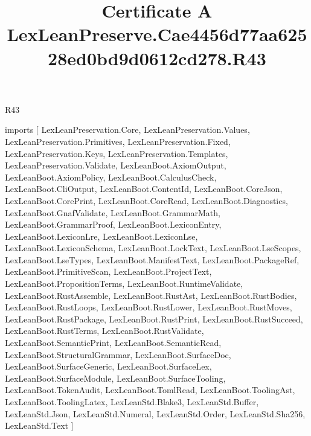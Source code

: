 \begin{lexlean}{R43}
\title{Certificate A LexLeanPreserve.Cae4456d77aa62528ed0bd9d0612cd278.R43}
\begin{coremodule}
imports [
  LexLeanPreservation.Core,
  LexLeanPreservation.Values,
  LexLeanPreservation.Primitives,
  LexLeanPreservation.Fixed,
  LexLeanPreservation.Keys,
  LexLeanPreservation.Templates,
  LexLeanPreservation.Validate,
  LexLeanBoot.AxiomOutput,
  LexLeanBoot.AxiomPolicy,
  LexLeanBoot.CalculusCheck,
  LexLeanBoot.CliOutput,
  LexLeanBoot.ContentId,
  LexLeanBoot.CoreJson,
  LexLeanBoot.CorePrint,
  LexLeanBoot.CoreRead,
  LexLeanBoot.Diagnostics,
  LexLeanBoot.GnafValidate,
  LexLeanBoot.GrammarMath,
  LexLeanBoot.GrammarProof,
  LexLeanBoot.LexiconEntry,
  LexLeanBoot.LexiconLre,
  LexLeanBoot.LexiconLse,
  LexLeanBoot.LexiconSchema,
  LexLeanBoot.LockText,
  LexLeanBoot.LseScopes,
  LexLeanBoot.LseTypes,
  LexLeanBoot.ManifestText,
  LexLeanBoot.PackageRef,
  LexLeanBoot.PrimitiveScan,
  LexLeanBoot.ProjectText,
  LexLeanBoot.PropositionTerms,
  LexLeanBoot.RuntimeValidate,
  LexLeanBoot.RustAssemble,
  LexLeanBoot.RustAst,
  LexLeanBoot.RustBodies,
  LexLeanBoot.RustLoops,
  LexLeanBoot.RustLower,
  LexLeanBoot.RustMoves,
  LexLeanBoot.RustPackage,
  LexLeanBoot.RustPrint,
  LexLeanBoot.RustSucceed,
  LexLeanBoot.RustTerms,
  LexLeanBoot.RustValidate,
  LexLeanBoot.SemanticPrint,
  LexLeanBoot.SemanticRead,
  LexLeanBoot.StructuralGrammar,
  LexLeanBoot.SurfaceDoc,
  LexLeanBoot.SurfaceGeneric,
  LexLeanBoot.SurfaceLex,
  LexLeanBoot.SurfaceModule,
  LexLeanBoot.SurfaceTooling,
  LexLeanBoot.TokenAudit,
  LexLeanBoot.TomlRead,
  LexLeanBoot.ToolingAst,
  LexLeanBoot.ToolingLatex,
  LexLeanStd.Blake3,
  LexLeanStd.Buffer,
  LexLeanStd.Json,
  LexLeanStd.Numeral,
  LexLeanStd.Order,
  LexLeanStd.Sha256,
  LexLeanStd.Text
]


\end{coremodule}
\end{lexlean}
